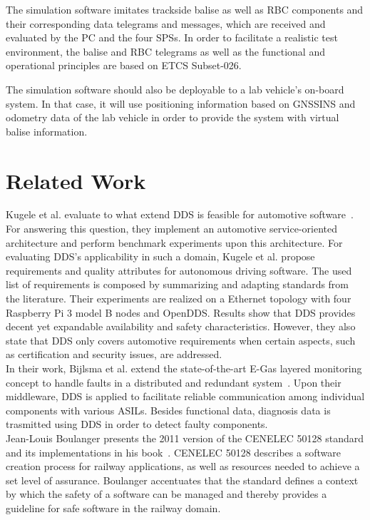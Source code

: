 \documentclass[a4paper, 12pt]{scrartcl}
\begin{document}
The simulation software imitates trackside balise as well as \ac{RBC} components and their corresponding data telegrams and messages, which are received and evaluated by the PC and the four \acp{SPS}.
In order to facilitate a realistic test environment, the balise and \ac{RBC} telegrams as well as the functional and operational principles are based on \ac{ETCS} Subset-026.

The simulation software should also be deployable to a lab vehicle's on-board system.
In that case, it will use positioning information based on \ac{GNSSINS} and odometry data of the lab vehicle in order to provide the system with virtual balise information.


\section*{Related Work}
Kugele et al. evaluate to what extend \ac{DDS} is feasible for automotive software~\cite{KugeleDataCentricForAuto}.
For answering this question, they implement an automotive service-oriented architecture and perform benchmark experiments upon this architecture.
For evaluating \ac{DDS}'s applicability in such a domain, Kugele et al. propose requirements and quality attributes for autonomous driving software.
The used list of requirements is composed by summarizing and adapting standards from the literature.
Their experiments are realized on a Ethernet topology with four Raspberry Pi 3 model B nodes and OpenDDS.
Results show that \ac{DDS} provides decent yet expandable availability and safety characteristics.
However, they also state that \ac{DDS} only covers automotive requirements when certain aspects, such as certification and security issues, are addressed.
\\

In their work, Bijlsma et al. extend the state-of-the-art E-Gas layered monitoring concept to handle faults in a distributed and redundant system~\cite{DistributedSafety2020}.
Upon their middleware, \ac{DDS} is applied to facilitate reliable communication among individual components with various \acp{ASIL}.
Besides functional data, diagnosis data is trasmitted using \ac{DDS} in order to detect faulty components.
\\

Jean-Louis Boulanger presents the 2011 version of the CENELEC 50128 standard and its implementations in his book~\cite{BoulangerStandards}.
CENELEC 50128 describes a software creation process for railway applications, as well as resources needed to achieve a set level of assurance.
Boulanger accentuates that the standard defines a context by which the safety of a software can be managed and thereby provides a guideline for safe software in the railway domain.
\\
\end{document}
